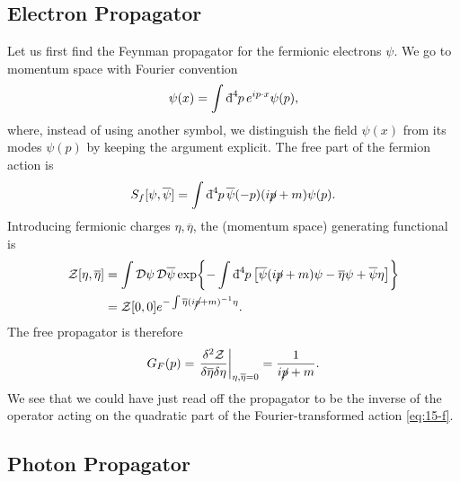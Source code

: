 \subsection*{Electron Propagator}%

Let us first find the Feynman propagator for the fermionic electrons $\psi$. We go to momentum space with Fourier convention
\begin{equation}
  \psi(x) = \int \bdd[4]{p} e^{i p \cdot x} \psi(p),
\end{equation}
where, instead of using another symbol, we distinguish the field $\psi(x)$ from its modes $\psi(p)$ by keeping the argument explicit.
The free part of the fermion action is
\begin{equation}
  \label{eq:15-f}
  S_f[\psi, \overline{\psi}{}] = \int \bdd[4]{p} \overline{\psi} (-p) (i \cancel{p} + m) \psi(p).
\end{equation}
Introducing fermionic charges $\eta, \overline{\eta}{}$, the (momentum space) generating functional is
\begin{align}
  \mathcal{Z} [\eta, \overline{\eta}{}] &= \int \pdd{\psi} \pdd{\overline{\psi}{}} \exp{ - \int \bdd[4]{p} \left[ \overline{\psi}{}(i \cancel{p} + m) \psi - \overline{\eta}{} \psi + \overline{\psi}{} \eta \right] } \\
					&= \mathcal{Z}[0, 0] e^{-\int \overline{\eta}{}(i \cancel{p} + m)^{-1} \eta}.
\end{align}
The free propagator is therefore 
\begin{equation}
  G_F(p) = \left.\frac{\delta^2 \mathcal{Z}}{\delta \overline{\eta}{} \delta \eta}\right\rvert_{\eta, \overline{\eta}{} = 0} = \frac{1}{i \cancel{p} + m}.
\end{equation}
We see that we could have just read off the propagator to be the inverse of the operator acting on the quadratic part of the Fourier-transformed action \eqref{eq:15-f}.

\subsection*{Photon Propagator}%

